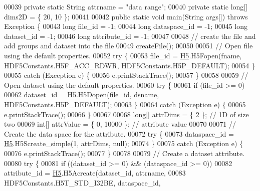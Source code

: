 \begin{DoxyCode}
00039     \textcolor{keyword}{private} \textcolor{keyword}{static} String attrname  = \textcolor{stringliteral}{"data range"};
00040     \textcolor{keyword}{private} \textcolor{keyword}{static} \textcolor{keywordtype}{long}[] dims2D = \{ 20, 10 \};
00041 
00042     \textcolor{keyword}{public} \textcolor{keyword}{static} \textcolor{keywordtype}{void} main(String args[]) \textcolor{keywordflow}{throws} Exception \{
00043         \textcolor{keywordtype}{long} file\_id = -1;
00044         \textcolor{keywordtype}{long} dataspace\_id = -1;
00045         \textcolor{keywordtype}{long} dataset\_id = -1;
00046         \textcolor{keywordtype}{long} attribute\_id = -1;
00047 
00048         \textcolor{comment}{// create the file and add groups and dataset into the file}
00049         createFile();
00050 
00051         \textcolor{comment}{// Open file using the default properties.}
00052         \textcolor{keywordflow}{try} \{
00053             file\_id = \hyperlink{namespace_h5}{H5}.H5Fopen(fname, HDF5Constants.H5F\_ACC\_RDWR, HDF5Constants.H5P\_DEFAULT);
00054         \}
00055         \textcolor{keywordflow}{catch} (Exception e) \{
00056             e.printStackTrace();
00057         \}
00058 
00059         \textcolor{comment}{// Open dataset using the default properties.}
00060         \textcolor{keywordflow}{try} \{
00061             \textcolor{keywordflow}{if} (file\_id >= 0)
00062                 dataset\_id = \hyperlink{namespace_h5}{H5}.H5Dopen(file\_id, dsname, HDF5Constants.H5P\_DEFAULT);
00063         \}
00064         \textcolor{keywordflow}{catch} (Exception e) \{
00065             e.printStackTrace();
00066         \}
00067 
00068         \textcolor{keywordtype}{long}[] attrDims = \{ 2 \}; \textcolor{comment}{// 1D of size two}
00069         \textcolor{keywordtype}{int}[] attrValue = \{ 0, 10000 \}; \textcolor{comment}{// attribute value}
00070 
00071         \textcolor{comment}{// Create the data space for the attribute.}
00072         \textcolor{keywordflow}{try} \{
00073             dataspace\_id = \hyperlink{namespace_h5}{H5}.H5Screate\_simple(1, attrDims, null);
00074         \}
00075         \textcolor{keywordflow}{catch} (Exception e) \{
00076             e.printStackTrace();
00077         \}
00078 
00079         \textcolor{comment}{// Create a dataset attribute.}
00080         \textcolor{keywordflow}{try} \{
00081             \textcolor{keywordflow}{if} ((dataset\_id >= 0) && (dataspace\_id >= 0))
00082                 attribute\_id = \hyperlink{namespace_h5}{H5}.H5Acreate(dataset\_id, attrname,
00083                         HDF5Constants.H5T\_STD\_I32BE, dataspace\_id,

\end{DoxyCode}
